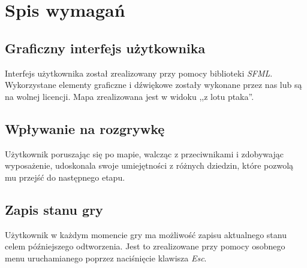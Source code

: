 \documentclass[10pt,a4paper]{article}
\begin{document}
\section{Spis wymagań}
\subsection{Graficzny interfejs użytkownika}
Interfejs użytkownika został zrealizowany przy pomocy biblioteki \textit{SFML}. Wykorzystane elementy graficzne i dźwiękowe zostały wykonane przez nas lub są na wolnej licencji. Mapa zrealizowana jest w widoku ,,z lotu ptaka''.

\subsection{Wpływanie na rozgrywkę}
Użytkownik poruszając się po mapie, walcząc z przeciwnikami i zdobywając wyposażenie, udoskonala swoje umiejętności z różnych dziedzin, które pozwolą mu przejść do następnego etapu.

\subsection{Zapis stanu gry}
Użytkownik w każdym momencie gry ma możliwość zapisu aktualnego stanu celem późniejszego odtworzenia. Jest to zrealizowane przy pomocy osobnego menu uruchamianego poprzez naciśnięcie klawisza \textit{Esc}.
\end{document}
